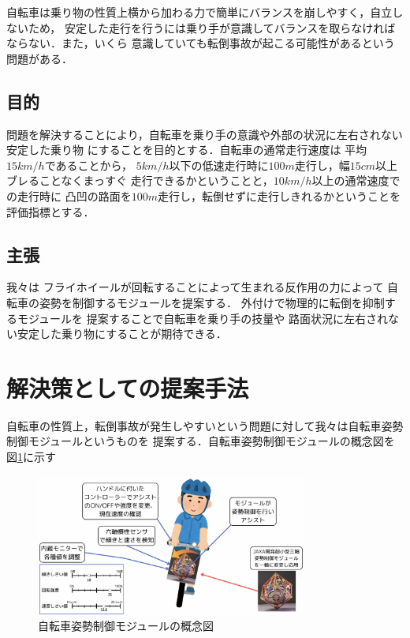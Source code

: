 \documentclass[uplatex,dvipdfmx]{jsarticle}
\begin{document}
自転車は乗り物の性質上横から加わる力で簡単にバランスを崩しやすく，自立しないため，
安定した走行を行うには乗り手が意識してバランスを取らなければならない．また，いくら
意識していても転倒事故が起こる可能性があるという問題がある．

\subsection{目的}

問題を解決することにより，自転車を乗り手の意識や外部の状況に左右されない安定した乗り物
にすることを目的とする．自転車の通常走行速度は
平均$15km/h$であることから，
$5km/h$以下の低速走行時に$100m$走行し，幅$15cm$以上ブレることなくまっすぐ
走行できるかということと，$10km/h$以上の通常速度での走行時に
凸凹の路面を$100m$走行し，転倒せずに走行しきれるかということを評価指標とする．

\subsection{主張}

我々は
フライホイールが回転することによって生まれる反作用の力によって
自転車の姿勢を制御するモジュールを提案する．
外付けで物理的に転倒を抑制するモジュールを
提案することで自転車を乗り手の技量や
路面状況に左右されない安定した乗り物にすることが期待できる．
\section{解決策としての提案手法}

自転車の性質上，転倒事故が発生しやすいという問題に対して我々は自転車姿勢制御モジュールというものを
提案する．自転車姿勢制御モジュールの概念図を図\ref{fig:moduleGainenn}に示す

\begin{figure}[H]
    \centering
    \includegraphics[width=0.8\textwidth]{fig/moduleGainenn2.png}
    \caption{自転車姿勢制御モジュールの概念図}
    \label{fig:moduleGainenn}
\end{figure}
\end{document}
